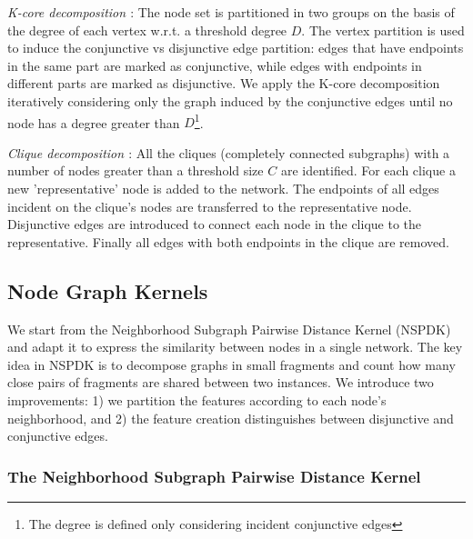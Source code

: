 \documentclass{esannV2}
\begin{document}
\textit{K-core decomposition \cite{kcore}}: The node set is partitioned in two
groups on the basis of the degree of each vertex w.r.t. a threshold degree
$D$. The vertex partition is used to induce the conjunctive vs disjunctive
edge partition: edges that have endpoints in the same part are marked as
conjunctive, while edges with endpoints in different parts are marked as
disjunctive. We apply the K-core decomposition iteratively considering only
the graph induced by the conjunctive edges until no node has a degree greater
than $D$\footnote{The degree is defined only considering incident conjunctive
edges}.

\textit{Clique decomposition \cite{clique}}:   All the cliques (completely
connected subgraphs) with a number of nodes greater than a threshold size $C$
are identified. For each clique a new 'representative' node is added to the
network. The endpoints of all edges incident on the clique's nodes are
transferred to the representative node. Disjunctive edges are introduced to
connect each node in the clique to the representative. Finally all edges with
both endpoints in the clique are removed.

\subsection{Node Graph Kernels} 

We start from the Neighborhood Subgraph Pairwise Distance Kernel (NSPDK)
\cite{nspdk} and adapt it to express the similarity between nodes in a single
network. The key idea in NSPDK is to decompose graphs in small fragments and
count how many close pairs of fragments are shared between two instances. We
introduce two improvements: 1) we partition the features according to each node's
neighborhood, and 2) the feature creation distinguishes between disjunctive and conjunctive edges.


\subsubsection{The Neighborhood Subgraph Pairwise Distance Kernel}
\end{document}
